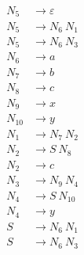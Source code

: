 \begin{align*}
N_5 &\rightarrow \varepsilon \\
N_5 &\rightarrow N_6\ N_1 \\
N_5 &\rightarrow N_6\ N_3 \\
N_6 &\rightarrow a \\
N_7 &\rightarrow b \\
N_8 &\rightarrow c \\
N_9 &\rightarrow x \\
N_10 &\rightarrow y \\
N_1 &\rightarrow N_7\ N_2 \\
N_2 &\rightarrow S\ N_8 \\
N_2 &\rightarrow c \\
N_3 &\rightarrow N_9\ N_4 \\
N_4 &\rightarrow S\ N_10 \\
N_4 &\rightarrow y \\
S &\rightarrow N_6\ N_1 \\
S &\rightarrow N_6\ N_3 \\
\end{align*}